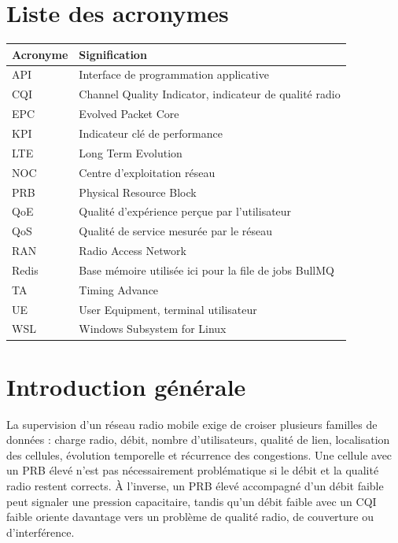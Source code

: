 \documentclass[12pt,a4paper,oneside]{report}
\begin{document}
\chapter*{Liste des acronymes}
\begin{longtable}{p{3cm}p{11cm}}
\toprule
\textbf{Acronyme} & \textbf{Signification} \\
\midrule
API & Interface de programmation applicative \\
CQI & Channel Quality Indicator, indicateur de qualité radio \\
EPC & Evolved Packet Core \\
KPI & Indicateur clé de performance \\
LTE & Long Term Evolution \\
NOC & Centre d'exploitation réseau \\
PRB & Physical Resource Block \\
QoE & Qualité d'expérience perçue par l'utilisateur \\
QoS & Qualité de service mesurée par le réseau \\
RAN & Radio Access Network \\
Redis & Base mémoire utilisée ici pour la file de jobs BullMQ \\
TA & Timing Advance \\
UE & User Equipment, terminal utilisateur \\
WSL & Windows Subsystem for Linux \\
\bottomrule
\end{longtable}

\listoffigures
\listoftables
\tableofcontents
\clearpage
{}

\chapter{Introduction générale}
La supervision d'un réseau radio mobile exige de croiser plusieurs familles de données : charge radio, débit, nombre d'utilisateurs, qualité de lien, localisation des cellules, évolution temporelle et récurrence des congestions. Une cellule avec un PRB élevé n'est pas nécessairement problématique si le débit et la qualité radio restent corrects. À l'inverse, un PRB élevé accompagné d'un débit faible peut signaler une pression capacitaire, tandis qu'un débit faible avec un CQI faible oriente davantage vers un problème de qualité radio, de couverture ou d'interférence.
\end{document}

